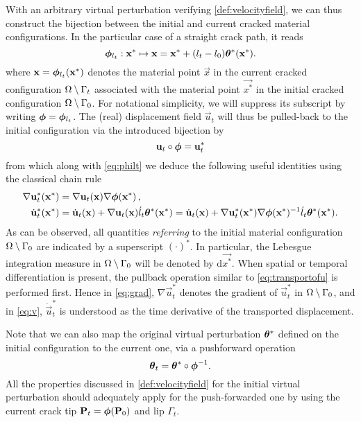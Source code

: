 With an arbitrary virtual perturbation verifying \cref{def:velocityfield}, we can thus construct the bijection between the initial and current cracked material configurations. In the particular case of a straight crack path, it reads
\begin{equation} \label{eq:philt}
\philt_{l_t}:\vec{x}^*\mapsto\vec{x}=\vec{x}^*+(l_t-l_0)\vtheta^*(\vec{x}^*).
\end{equation}
where $\vec{x}=\philt_{l_t}(\vec{x}^*)$ denotes the material point $\vec{x}$ in the current cracked configuration ${\Omega\setminus\Gamma_t}$ associated with the material point $\vec{x^*}$ in the initial cracked configuration ${\Omega\setminus\Gamma_0}$. For notational simplicity, we will suppress its subscript by writing $\philt=\philt_{l_t}$. The (real) displacement field $\vec{u}_t$ will thus be pulled-back to the initial configuration via the introduced bijection by
\begin{equation} \label{eq:transportofu}
\vec{u}_t\circ\philt=\vec{u}_t^*
\end{equation}
from which along with \eqref{eq:philt} we deduce the following useful identities using the classical chain rule
\begin{align}
\nabla\vec{u}_t^*(\vec{x}^*) &= \nabla\vec{u}_t(\vec{x})\nabla\philt(\vec{x}^*)\,, \label{eq:grad} \\
\dot{\vec{u}}_t^*(\vec{x}^*) &= \dot{\vec{u}}_t(\vec{x})+\nabla\vec{u}_t(\vec{x})\dot{l}_t\vtheta^*(\vec{x}^*)=\dot{\vec{u}}_t(\vec{x})+\nabla\vec{u}_t^*(\vec{x}^*)\nabla\philt(\vec{x}^*)^{-1}\dot{l}_t\vtheta^*(\vec{x}^*). \label{eq:v}
\end{align}
As can be observed, all quantities \emph{referring} to the initial material configuration ${\Omega\setminus\Gamma_0}$ are indicated by a superscript $(\cdot)^*$. In particular, the Lebesgue integration measure in ${\Omega\setminus\Gamma_0}$ will be denoted by $\mathrm{d}\vec{x^*}$. When spatial or temporal differentiation is present, the pullback operation similar to \eqref{eq:transportofu} is performed first. Hence in \eqref{eq:grad}, $\nabla\vec{u}_t^*$ denotes the gradient of $\vec{u}_t^*$ in ${\Omega\setminus\Gamma_0}$, and in \eqref{eq:v}, $\dot{\vec{u}}_t^*$ is understood as the time derivative of the transported displacement.

Note that we can also map the original virtual perturbation $\vtheta^*$ defined on the initial configuration to the current one, via a pushforward operation
\[
\vtheta_t=\vtheta^*\circ\philt^{-1}.
\]
All the properties discussed in \cref{def:velocityfield} for the initial virtual perturbation should adequately apply for the push-forwarded one by using the current crack tip $\vec{P}_t=\philt(\vec{P}_0)$ and lip $\Gamma_t$.

